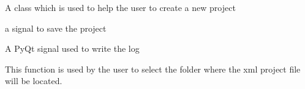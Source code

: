 \documentclass[letterpaper,10pt,english]{sphinxmanual}
\begin{document}

\begin{fulllineitems}
\label{\detokenize{index:src_GUI.Main_windows_1.CreateNewProject}}
A class which is used to help the user to create a new project

\begin{fulllineitems}
\label{\detokenize{index:src_GUI.Main_windows_1.CreateNewProject.init_iu}}
\end{fulllineitems}


\begin{fulllineitems}
\label{\detokenize{index:src_GUI.Main_windows_1.CreateNewProject.save_project}}
a signal to save the project

\end{fulllineitems}


\begin{fulllineitems}
\label{\detokenize{index:src_GUI.Main_windows_1.CreateNewProject.send_log}}
A PyQt signal used to write the log

\end{fulllineitems}


\begin{fulllineitems}
\label{\detokenize{index:src_GUI.Main_windows_1.CreateNewProject.setfolder}}
This function is used by the user to select the folder where the xml project file will be located.

\end{fulllineitems}


\end{fulllineitems}

\end{document}
